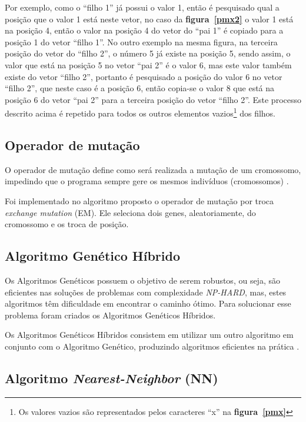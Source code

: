 \documentclass[12pt,openright,a4paper,oneside]{tcc}
\begin{document}
	   		Por exemplo, como o ``filho 1'' já possui o valor 1, então é pesquisado qual a posição que o valor 1 está neste vetor, no caso da \textbf{figura~\ref{pmx2}} o valor 1 está na posição 4, então o valor na posição 4 do vetor do ``pai 1'' é copiado para a posição 1 do vetor ``filho 1''. No outro exemplo na mesma figura, na terceira posição do vetor do ``filho 2'',  o número 5 já existe na posição 5, sendo assim, o valor que está na posição 5 no vetor ``pai 2'' é o valor 6, mas este valor também existe do vetor ``filho 2'', portanto é pesquisado a posição do valor 6 no vetor ``filho 2'', que neste caso é a posição 6, então copia-se o valor 8 que está na posição 6 do vetor ``pai 2'' para a terceira posição do vetor ``filho 2''. 
	   		Este processo descrito acima é repetido para todos os outros elementos vazios\footnote{Os valores vazios são representados pelos caracteres ``x'' na \textbf{figura~\ref{pmx}}} dos filhos.
	   		  
		\subsection{Operador de mutação}
			\label{Sem}
			O operador de mutação define como será realizada a mutação de um cromossomo, impedindo que o programa sempre gere os mesmos indivíduos (cromossomos) \cite{0012-pdf}.

			Foi implementado no algoritmo proposto o operador de mutação por troca \textit{exchange mutation} (EM). Ele seleciona dois genes, aleatoriamente, do cromossomo e os troca de posição.

		\subsection{Algoritmo Genético Híbrido}

			Os Algoritmos Genéticos possuem o objetivo de serem robustos, ou seja, são eficientes nas soluções de problemas com complexidade \textit{NP-HARD}, mas, estes algoritmos têm dificuldade em encontrar o caminho ótimo. Para solucionar esse problema foram criados os Algoritmos Genéticos Híbridos.

			Os Algoritmos Genéticos Híbridos consistem em utilizar um outro algoritmo em conjunto com o Algoritmo Genético, produzindo algoritmos eficientes na prática \cite{TravelingTheory}.

        \subsection{Algoritmo \textit{Nearest-Neighbor} (NN)}
\end{document}
